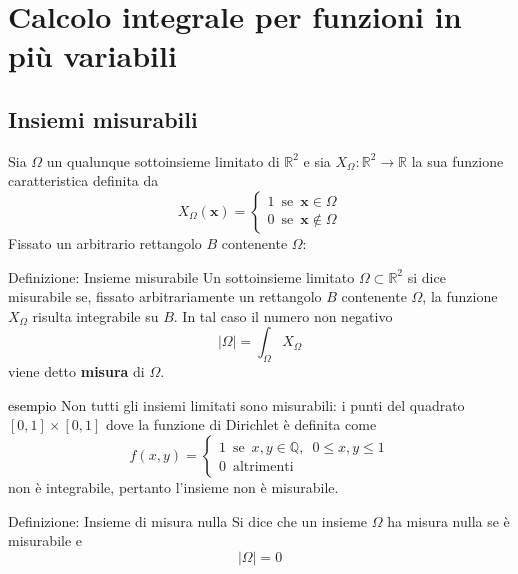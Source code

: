 \documentclass[x11names]{article}
\begin{document}
	
	\newpage
	\section{Calcolo integrale per funzioni in più variabili}
	\subsection{Insiemi misurabili}
	Sia \(\Omega\) un qualunque sottoinsieme limitato di \(\mathbb{R}^2\) e sia \(X_{\Omega}:\mathbb{R}^2\to \mathbb{R}\) la sua funzione caratteristica definita da
	\[ 
	X_{\Omega}(\boldsymbol{x}) = \begin{cases}
		1 \;\ \text{se} \;\ \boldsymbol{x} \in \Omega \\
		0 \;\ \text{se} \;\ \boldsymbol{x} \notin \Omega
	\end{cases}
	\]
	Fissato un arbitrario rettangolo \(B\) contenente \(\Omega\):
	\begin{center}
		\colorbox{myblue}{\begin{minipage}{5.75in}
				\begin{blues}{Definizione: Insieme misurabile}
					Un sottoinsieme limitato \(\Omega \subset \mathbb{R}^2\) si dice misurabile se, fissato arbitrariamente un rettangolo \(B\) contenente \(\Omega\), la funzione \(X_{\Omega}\) risulta integrabile su \(B\). In tal caso il numero non negativo
					\[ 
					|\Omega | = \int_\Omega X_{\Omega}
					\] 
					viene detto \textbf{misura} di \(\Omega\).
				\end{blues}
		\end{minipage}}      
	\end{center}
	\begin{es}{\textcolor{black}{esempio}}
		Non tutti gli insiemi limitati sono misurabili: i punti del quadrato \([0,1] \times [0,1]\) dove la funzione di Dirichlet è definita come
		\[ 
		f(x,y) = \begin{cases}
			1 \;\ \text{se} \;\ x,y \in \mathbb{Q}, \;\ 0 \leq x,y \leq 1 \\
			0 \;\ \text{altrimenti}
		\end{cases}
		\]
		non è integrabile, pertanto l'insieme non è misurabile.
	\end{es}
	\begin{center}
		\colorbox{myblue}{\begin{minipage}{5.75in}
				\begin{blues}{Definizione: Insieme di misura nulla}
					Si dice che un insieme \(\Omega\) ha misura nulla se è misurabile e 
					\[ 
					|\Omega| = 0
					\]
				\end{blues}
		\end{minipage}}      
	\end{center}
\end{document}
